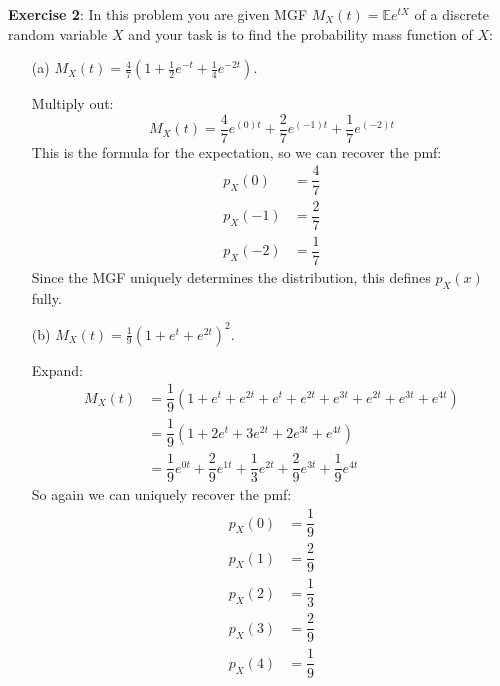 \documentclass{article}
\begin{document}
\newpage

\textbf{Exercise 2}: In this problem you are given MGF $M_{X}(t) = \mathbb{E}e^{tX}$ of a discrete random variable $X$ and your task is to find the probability mass function of $X$:
    \begin{itemize}
        \item [(a)] $M_{X}(t) = \frac{4}{7}\left(1 + \frac{1}{2}e^{-t} + \frac{1}{4}e^{-2t}\right)$.
            \begin{answer}
                Multiply out:
                    \begin{equation*}
                        M_{X}(t) = \dfrac{4}{7}e^{(0) t} + \dfrac{2}{7}e^{(-1)t} + \dfrac{1}{7}e^{(-2)t}
                    \end{equation*}
                This is the formula for the expectation, so we can recover the pmf:
                    \begin{align*}
                        p_{X}(0)  &= \dfrac{4}{7} \\
                        p_{X}(-1) &= \dfrac{2}{7} \\
                        p_{X}(-2) &= \dfrac{1}{7}   
                    \end{align*}
                Since the MGF uniquely determines the distribution, this defines $p_{X}(x)$ fully.
            \end{answer}

        \item [(b)] $M_{X}(t) = \frac{1}{9}\left(1 + e^{t} + e^{2t}\right)^{2}$.
            \begin{answer}
                Expand:
                    \begin{align*}
                        M_{X}(t) &= \dfrac{1}{9}(1 + e^{t} + e^{2t} + e^{t} + e^{2t} + e^{3t} + e^{2t} + e^{3t} + e^{4t}) \\
                                 &= \dfrac{1}{9}(1 + 2e^{t} + 3e^{2t} + 2e^{3t} + e^{4t}) \\
                                 &= \dfrac{1}{9}e^{0t} + \dfrac{2}{9}e^{1t} + \dfrac{1}{3}e^{2t} + \dfrac{2}{9}e^{3t} + \dfrac{1}{9}e^{4t}
                    \end{align*}
                So again we can uniquely recover the pmf:
                    \begin{align*}
                        p_{X}(0) &= \dfrac{1}{9} \\
                        p_{X}(1) &= \dfrac{2}{9} \\
                        p_{X}(2) &= \dfrac{1}{3} \\
                        p_{X}(3) &= \dfrac{2}{9} \\
                        p_{X}(4) &= \dfrac{1}{9}   
                    \end{align*}
            \end{answer}


\end{itemize}
\end{document}
